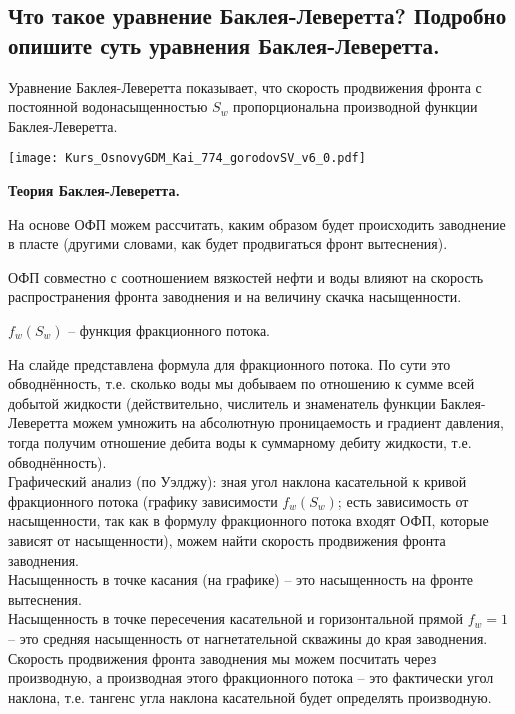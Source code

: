 

\subsection{Что такое уравнение Баклея-Леверетта? Подробно опишите суть уравнения Баклея-Леверетта.}

Уравнение Баклея-Леверетта показывает, что скорость продвижения фронта с постоянной водонасыщенностью $S_w$ пропорциональна производной функции Баклея-Леверетта.

\texttt{[image: Kurs\_OsnovyGDM\_Kai\_774\_gorodovSV\_v6\_0.pdf]}

\textbf{Теория Баклея-Леверетта.}

На основе ОФП можем рассчитать, каким образом будет происходить заводнение в пласте  (другими словами, как будет продвигаться фронт вытеснения).

ОФП совместно с соотношением вязкостей нефти и воды влияют на скорость распространения фронта заводнения и на величину скачка насыщенности.

$f_w(S_w)$ -- функция фракционного потока.

На слайде представлена формула для фракционного потока.
По сути это обводнённость, т.е. сколько воды мы добываем по отношению к сумме всей добытой жидкости (действительно, числитель и знаменатель функции Баклея-Леверетта можем умножить на абсолютную проницаемость и градиент давления, тогда получим отношение дебита воды к суммарному дебиту жидкости, т.е. обводнённость).
\\

Графический анализ (по Уэлджу): зная угол наклона касательной к кривой фракционного потока (графику зависимости $f_w(S_w)$; есть зависимость от насыщенности, так как в формулу фракционного потока входят ОФП, которые зависят от насыщенности), можем найти скорость продвижения фронта заводнения.
\\

Насыщенность в точке касания (на графике) -- это насыщенность на фронте вытеснения.
\\

Насыщенность в точке пересечения касательной и горизонтальной прямой $f_w=1$ -- это средняя насыщенность от нагнетательной скважины до края заводнения.
\\

Скорость продвижения фронта заводнения мы можем посчитать через производную, а производная этого фракционного потока -- это фактически угол наклона, т.е. тангенс угла наклона касательной будет определять производную.
\\

